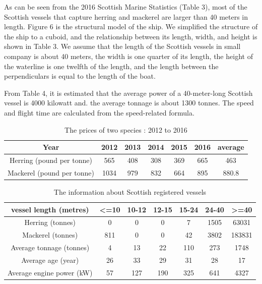 \documentclass{mcmthesis}
\begin{document}
As can be seen from the 2016 Scottish Marine Statistics (Table 3), most of the Scottish vessels that capture herring and mackerel are larger than 40 meters in length. Figure 6 is the structural model of the ship. We simplified the structure of the ship to a cuboid, and the relationship between its length, width, and height is shown in Table 3. We assume that the length of the Scottish vessels in small company is about 40 meters, the width is one quarter of its length, the height of the waterline is one twelfth of the length, and the length between the  perpendiculars  is equal to the length of the boat.


From Table 4, it is estimated that the average power of a 40-meter-long Scottish vessel is 4000 kilowatt and. the average tonnage is about 1300 tonnes. The speed and flight time are calculated from the speed-related formula.



\begin{table}[!htb]
\centering
\setlength{\abovecaptionskip}{0pt}%
\setlength{\belowcaptionskip}{13pt}%
\caption{The prices of two species : 2012 to 2016}
\begin{tabular}{ccccccc}
\toprule[1.5pt]
Year&2012&2013&2014&2015&2016&average\\
\bottomrule[1.5pt]
Herring (pound  per tonne)  &565&408&308&369&665&463\\
Mackerel (pound  per tonne)  &1034&979&832&664&895&880.8\\
\bottomrule[1.5pt]
\end{tabular}
\end{table}


\begin{table}[!htb]
\centering
\setlength{\abovecaptionskip}{0pt}%
\setlength{\belowcaptionskip}{13pt}%
\caption{The information about Scottish registered vessels}
\begin{tabular}{ccccccc}
\toprule[1.5pt]
vessel length (metres)&<=10&10-12&12-15&15-24&24-40&>=40\\
\bottomrule[1.5pt]
Herring (tonnes)&0&0&0&7&1505&63031\\
Mackerel (tonnes) &811&0&0&42&3802&183831\\
Average tonnage (tonnes)&4&13&22&110&273&1748\\
Average age (year)&26&33&29&31&28&17\\
Average engine power (kW)&57&127&190&325&641&4327\\

\bottomrule[1.5pt]
\end{tabular}
\end{table}
\end{document}
